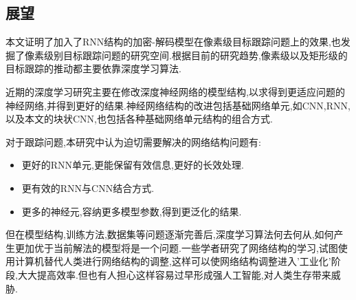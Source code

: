 \subsection{展望}
本文证明了加入了RNN结构的加密-解码模型在像素级目标跟踪问题上的效果,也发掘了像素级别目标跟踪问题的研究空间.根据目前的研究趋势,像素级以及矩形级的目标跟踪的推动都主要依靠深度学习算法.
\par
近期的深度学习研究主要在修改深度神经网络的模型结构,以求得到更适应问题的神经网络,并得到更好的结果.神经网络结构的改进包括基础网络单元,如CNN,RNN,以及本文的块状CNN,也包括各种基础网络单元结构的组合方式.
\par
对于跟踪问题,本研究中认为迫切需要解决的网络结构问题有:
\begin{itemize}
    \item 更好的RNN单元,更能保留有效信息,更好的长效处理.
    \item 更有效的RNN与CNN结合方式.
    \item 更多的神经元,容纳更多模型参数,得到更泛化的结果.
\end{itemize}
\par
但在模型结构,训练方法,数据集等问题逐渐完善后,深度学习算法何去何从,如何产生更加优于当前解法的模型将是一个问题.一些学者研究了网络结构的学习\supercite{cortes2017adanet},试图使用计算机替代人类进行网络结构的调整,这样可以使网络结构调整进入'工业化'阶段,大大提高效率.但也有人担心这样容易过早形成强人工智能\supercite{kurzweil2005singularity},对人类生存带来威胁.

